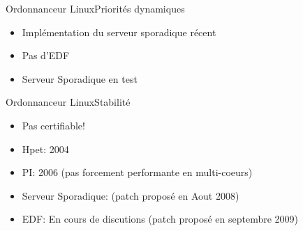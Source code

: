 \begin{frame}{Ordonnanceur Linux}{Priorités dynamiques}
  \begin{itemize}
  \item Implémentation du serveur sporadique récent
  \item Pas d'EDF
  \item Serveur Sporadique en test
  \end{itemize}
\end{frame}

\begin{frame}{Ordonnanceur Linux}{Stabilité}
  \begin{itemize}
  \item Pas certifiable!
  \item Hpet: 2004
  \item PI: 2006 (pas forcement performante en multi-coeurs)
  \item Serveur Sporadique: (patch proposé en Aout 2008)
  \item EDF: En cours de discutions (patch proposé en septembre 2009)
  \end{itemize}
\end{frame}



